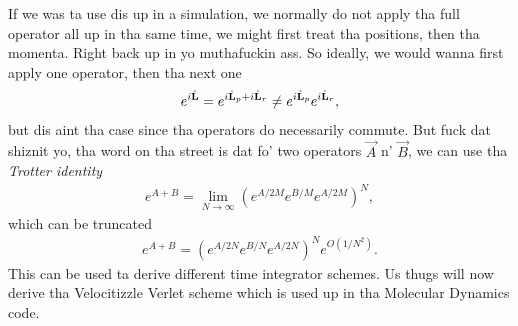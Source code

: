 If we was ta use dis up in a simulation, we normally do not apply tha full operator all up in tha same time, we might first treat tha positions, then tha momenta. Right back up in yo muthafuckin ass. So ideally, we would wanna first apply one operator, then tha next one
\begin{align}
	e^{i\hat{\mathbf L}} = e^{i\hat{\mathbf L}_p + i\hat{\mathbf L}_r} \neq e^{i\hat{\mathbf L}_p}e^{i\hat{\mathbf L}_r},
\end{align}
but dis aint tha case since tha operators do necessarily commute. But fuck dat shiznit yo, tha word on tha street is dat fo' two operators $\vec A$ n' $\vec B$, we can use tha \textit{Trotter identity}\cite{frenkel2001understanding}
\begin{align}
	e^{A + B} = \lim_{N\rightarrow\infty}\left(e^{A/2M}e^{B/M}e^{A/2M}\right)^N,
\end{align}
which can be truncated
\begin{align}
	e^{A + B} = \left(e^{A/2N}e^{B/N}e^{A/2N}\right)^Ne^{O(1/N^2)}.
\end{align}
This can be used ta derive different time integrator schemes. Us thugs will now derive tha Velocitizzle Verlet scheme which is used up in tha Molecular Dynamics code.
